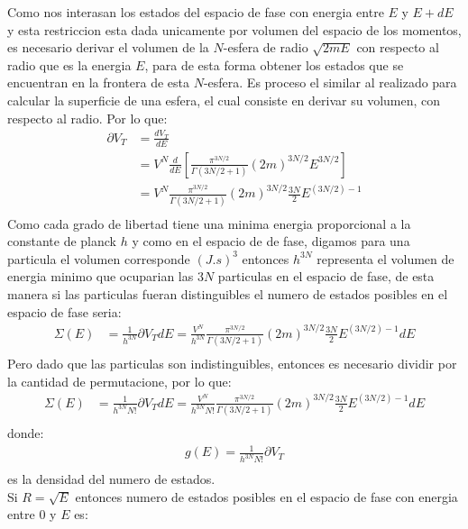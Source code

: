 \begin{answer}[literal b]
    Como nos interasan los estados del espacio de fase con energia entre $E$ y $E + dE$ y esta restriccion esta dada unicamente por volumen del espacio de los momentos, es necesario 
    derivar el volumen de la $N$-esfera de radio $\sqrt{2mE}$ con respecto al radio que es la energia $E$, para de esta forma obtener los estados que se encuentran en la frontera de esta
    $N$-esfera. Es proceso el similar al realizado para calcular la superficie de una esfera, el cual consiste en derivar su volumen, con respecto al radio. Por lo que:
    \begin{align*}
        \partial V_T &= \frac{dV_T}{dE}\\
        &= V^N \frac{d}{dE}\left[
            \frac{\pi^{3N/2}}{\Gamma(3N/2 + 1)} (2m)^{3N/2} E^{3N/2}
        \right]\\
        &= V^N \frac{\pi^{3N/2}}{\Gamma(3N/2 + 1)} (2m)^{3N/2} \frac{3N}{2} E^{(3N/2) - 1}\\
    \end{align*}
    Como cada grado de libertad tiene una minima energia proporcional a la constante de planck $h$ y como en el espacio de 
    de fase, digamos para una particula el volumen corresponde $(J.s)^3$ entonces $h^{3N}$ representa el volumen de energia minimo que ocuparian las $3N$ particulas en el espacio de fase,
    de esta manera si las particulas fueran distinguibles el numero de estados posibles en el espacio de fase seria:
    \begin{align*}
        \Sigma(E) &= \frac{1}{h^{3N}}\partial V_T dE= \frac{V^N}{h^{3N}} \frac{\pi^{3N/2}}{\Gamma(3N/2 + 1)} (2m)^{3N/2} \frac{3N}{2} E^{(3N/2) - 1}dE\\
    \end{align*}
    Pero dado que las particulas son indistinguibles, entonces es necesario dividir por la cantidad de permutacione, por lo que:
    \begin{align*}
        \Sigma(E) &= \frac{1}{h^{3N}N!}\partial V_T dE= \frac{V^N}{h^{3N}N!} \frac{\pi^{3N/2}}{\Gamma(3N/2 + 1)} (2m)^{3N/2} \frac{3N}{2} E^{(3N/2) - 1}dE\\
    \end{align*}
    donde:
    \begin{align*}
        g(E) = \frac{1}{h^{3N}N!}\partial V_T\\
    \end{align*}
    es la densidad del numero de estados.\\
    Si $R = \sqrt{E}$ entonces numero de estados posibles en el espacio de fase con energia entre $0$ y $E$ es:


\end{answer}
